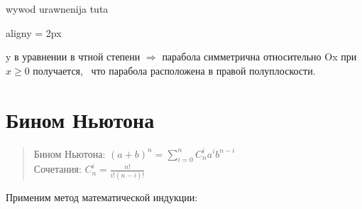 \documentclass[oneside]{book}
\newcommand{\boxedeq}[2]{\begin{empheq}[box={\fboxsep=6pt\fbox}]{align}\label{#1}#2\end{empheq}}
\begin{document}
\begin{enumerate}
\begin{center}
    wywod urawnenija tuta

    \boxedeq{eq:*}{y = \pm 2px}
\end{center}
y в уравнении в чтной степени $\Rightarrow$ парабола симметрична относительно Ox при $x \geq 0$ получается, \
что парабола расположена в правой полуплоскости.

\chapter{Бином Ньютона}
\begin{quote}
	Бином Ньютона:
	$(a+b)^n=\sum\limits_{i=0}^nC_{n}^ia^ib^{n-i}$\\
	Сочетания: $C_{n}^i= \frac{n!}{i!(n-i)!} $
\end{quote}
Применим метод математической индукции:


\end{enumerate}
\end{document}
